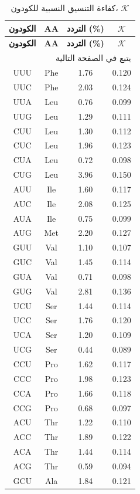 \documentclass[11pt,a4paper]{article}
\newcommand{\REL}{\mathcal{K}}
\begin{document}
	\begin{longtable}{|c|c|c|c|}
		\caption{كفاءة التنسيق النسبية للكودون، \(\REL\)}\label{tab:codons}\\
		\hline
		\textbf{الكودون} & \textbf{AA} & \textbf{التردد (\%)} & \(\REL\) \\
		\hline
		\endfirsthead
		\hline
		\textbf{الكودون} & \textbf{AA} & \textbf{التردد (\%)} & \(\REL\) \\
		\hline
		\endhead
		\hline
		\multicolumn{4}{r}{يتبع في الصفحة التالية}\\
		\endfoot
		\hline
		\endlastfoot
		UUU & Phe & 1.76 & 0.120 \\
		UUC & Phe & 2.03 & 0.124 \\
		UUA & Leu & 0.76 & 0.099 \\
		UUG & Leu & 1.29 & 0.111 \\
		CUU & Leu & 1.30 & 0.112 \\
		CUC & Leu & 1.96 & 0.123 \\
		CUA & Leu & 0.72 & 0.098 \\
		CUG & Leu & 3.96 & 0.150 \\
		AUU & Ile & 1.60 & 0.117 \\
		AUC & Ile & 2.08 & 0.125 \\
		AUA & Ile & 0.75 & 0.099 \\
		AUG & Met & 2.20 & 0.127 \\
		GUU & Val & 1.10 & 0.107 \\
		GUC & Val & 1.45 & 0.114 \\
		GUA & Val & 0.71 & 0.098 \\
		GUG & Val & 2.81 & 0.136 \\
		UCU & Ser & 1.44 & 0.114 \\
		UCC & Ser & 1.76 & 0.120 \\
		UCA & Ser & 1.20 & 0.109 \\
		UCG & Ser & 0.44 & 0.089 \\
		CCU & Pro & 1.62 & 0.117 \\
		CCC & Pro & 1.98 & 0.123 \\
		CCA & Pro & 1.66 & 0.118 \\
		CCG & Pro & 0.68 & 0.097 \\
		ACU & Thr & 1.22 & 0.110 \\
		ACC & Thr & 1.89 & 0.122 \\
		ACA & Thr & 1.44 & 0.114 \\
		ACG & Thr & 0.59 & 0.094 \\
		GCU & Ala & 1.84 & 0.121 \\

\end{longtable}
\end{document}
